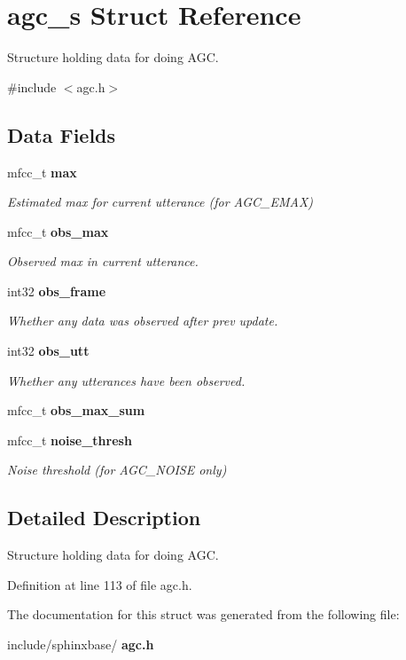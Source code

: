 \section{agc\+\_\+s Struct Reference}
\label{structagc__s}


Structure holding data for doing A\+GC.  




{\ttfamily \#include $<$agc.\+h$>$}

\subsection*{Data Fields}
\begin{DoxyCompactItemize}
\item 
\mbox{\label{structagc__s_a6a55c54c76a2e0373a907d186b89fa8e}} 
mfcc\+\_\+t \textbf{ max}
\begin{DoxyCompactList}\small\item\em Estimated max for current utterance (for A\+G\+C\+\_\+\+E\+M\+AX) \end{DoxyCompactList}\item 
\mbox{\label{structagc__s_a20c5289a6328895101e89cc3b418a1e4}} 
mfcc\+\_\+t \textbf{ obs\+\_\+max}
\begin{DoxyCompactList}\small\item\em Observed max in current utterance. \end{DoxyCompactList}\item 
\mbox{\label{structagc__s_a5a6c2e967089085bd4f6020876bcb92a}} 
int32 \textbf{ obs\+\_\+frame}
\begin{DoxyCompactList}\small\item\em Whether any data was observed after prev update. \end{DoxyCompactList}\item 
\mbox{\label{structagc__s_ae4ce95dcfb26c7f14ea316ac3ab202b2}} 
int32 \textbf{ obs\+\_\+utt}
\begin{DoxyCompactList}\small\item\em Whether any utterances have been observed. \end{DoxyCompactList}\item 
\mbox{\label{structagc__s_a760e1204ad4a77903c99d549dfaff3ab}} 
mfcc\+\_\+t {\bfseries obs\+\_\+max\+\_\+sum}
\item 
\mbox{\label{structagc__s_a4c896e65da00c79b77b23272474fcffc}} 
mfcc\+\_\+t \textbf{ noise\+\_\+thresh}
\begin{DoxyCompactList}\small\item\em Noise threshold (for A\+G\+C\+\_\+\+N\+O\+I\+SE only) \end{DoxyCompactList}\end{DoxyCompactItemize}


\subsection{Detailed Description}
Structure holding data for doing A\+GC. 

Definition at line 113 of file agc.\+h.



The documentation for this struct was generated from the following file\+:\begin{DoxyCompactItemize}
\item 
include/sphinxbase/\textbf{ agc.\+h}\end{DoxyCompactItemize}
